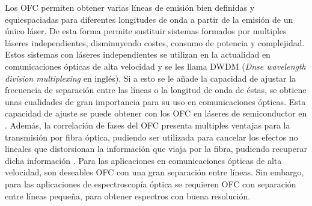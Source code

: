 		Los OFC permiten obtener varias l\'ineas de emisi\'on bien definidas y equiespaciadas para diferentes longitudes de onda a partir de la emisi\'on de un \'unico l\'aser. De esta forma permite sustituir sistemas formados por multiples l\'aseres independientes, disminuyendo costes, consumo de potencia y complejidad. Estos sistemas con láseres independientes se utilizan en la actualidad en comunicaciones ópticas de alta velocidad y se les llama DWDM (\textit{Dnse wavelength division multiplexing} en inglés). Si a esto se le añade la capacidad de ajustar la frecuencia de separación entre las líneas o la longitud de onda de éstas, se obtiene unas cualidades de gran importancia para su uso en comunicaciones \'opticas. Esta capacidad de ajuste se puede obtener con los OFC en láseres de semiconductor en \gs. Además, la correlación de fases del OFC presenta multiples ventajas para la transmisión por fibra óptica, pudiendo ser utilizada para cancelar los efectos no lineales que distorsionan la información que viaja por la fibra, pudiendo recuperar dicha información \cite{temprana2015overcoming}. Para las aplicaciones en comunicaciones ópticas de alta velocidad, son deseables OFC con una gran separación entre líneas. Sin embargo, para las aplicaciones de espectroscopía óptica se requieren OFC con separación entre líneas pequeña, para obtener espectros con buena resolución.
